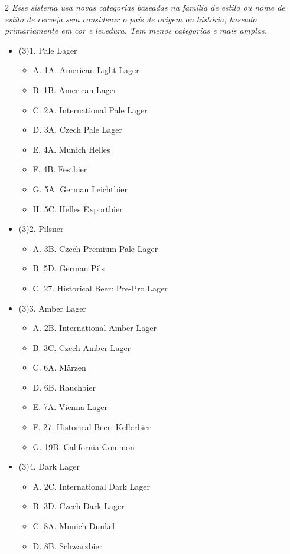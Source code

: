 \begin{multicols*}{2}
\textit{Esse sistema usa novas categorias baseadas na família de estilo ou nome de estilo de cerveja sem considerar o país de origem ou história; baseado primariamente em cor e levedura. Tem menos categorias e mais amplas.}

\begin{itemize}[noitemsep]
\item[] (3)1. Pale Lager
\begin{itemize}
  \item[] A. 1A. American Light Lager
  \item[] B. 1B. American Lager
  \item[] C. 2A. International Pale Lager
  \item[] D. 3A. Czech Pale Lager
  \item[] E. 4A. Munich Helles
  \item[] F. 4B. Festbier
  \item[] G. 5A. German Leichtbier
  \item[] H. 5C. Helles Exportbier
\end{itemize}
\item[] (3)2. Pilsner
\begin{itemize}
  \item[] A. 3B. Czech Premium Pale Lager
  \item[] B. 5D. German Pils
  \item[] C. 27. Historical Beer: Pre-Pro Lager
\end{itemize}
\item[] (3)3. Amber Lager
\begin{itemize}
  \item[] A. 2B. International Amber Lager
  \item[] B. 3C. Czech Amber Lager
  \item[] C. 6A. Märzen
  \item[] D. 6B. Rauchbier
  \item[] E. 7A. Vienna Lager
  \item[] F. 27. Historical Beer: Kellerbier
  \item[] G. 19B. California Common
\end{itemize}
\item[] (3)4. Dark Lager
\begin{itemize}
  \item[] A. 2C. International Dark Lager
  \item[] B. 3D. Czech Dark Lager
  \item[] C. 8A. Munich Dunkel
  \item[] D. 8B. Schwarzbier

\end{itemize}
\end{itemize}
\end{multicols*}
